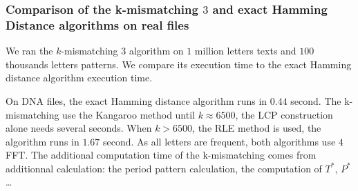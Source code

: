 \documentclass[preprint,12pt]{elsarticle}
\begin{document}







\subsubsection*{Comparison of the k-mismatching $3$ and exact Hamming Distance algorithms on real files}

We ran the $k$-mismatching $3$ algorithm
on $1$ million letters texts and $100$ thousands letters patterns.
We compare its execution time to the exact Hamming distance algorithm execution time.

On DNA files, the exact Hamming distance algorithm runs in $0.44$ second.
The k-mismatching use the Kangaroo method until $k \approx 6500$,
the LCP construction alone needs several seconds.
When $k>6500$, the RLE method is used, the algorithm runs in $1.67$ second.
As all letters are frequent, both algorithms use $4$ FFT.
The additional computation time of the k-mismatching comes from additionnal calculation: the period pattern calculation,
the computation of $T^*$, $P^*$\ldots
\end{document}
